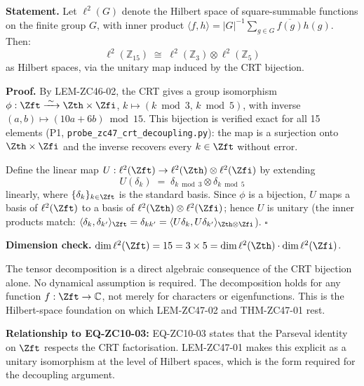 \documentclass[12pt, a4paper]{article}
\begin{document}
\begin{formalbox}[title={LEM-ZC47-01: $\ell^2(\mathbb{Z}_{15})
  \cong \ell^2(\mathbb{Z}_3) \otimes \ell^2(\mathbb{Z}_5)$
  (Tensor Decomposition)}]
\textbf{Statement.}
Let $\ell^2(G)$ denote the Hilbert space of square-summable
functions on the finite group $G$, with inner product
$\langle f, h \rangle = |G|^{-1}\sum_{g \in G}\overline{f(g)}h(g)$.
Then:
\[
  \ell^2(\mathbb{Z}_{15})
  \;\cong\;
  \ell^2(\mathbb{Z}_3) \otimes \ell^2(\mathbb{Z}_5)
\]
as Hilbert spaces, via the unitary map induced by the CRT bijection.

\textbf{Proof.}
By LEM-ZC46-02, the CRT gives a group isomorphism
$\phi: \Zft \xrightarrow{\;\sim\;} \Zth \times \Zfi$,
$k \mapsto (k \bmod 3,\, k \bmod 5)$,
with inverse $(a,b) \mapsto (10a + 6b) \bmod 15$.
This bijection is verified exact for all 15 elements
(P1, \texttt{probe\_zc47\_crt\_decoupling.py}): the map is
a surjection onto $\Zth \times \Zfi$ and the inverse recovers
every $k \in \Zft$ without error.

Define the linear map $U: \ell^2(\Zft) \to \ell^2(\Zth)
\otimes \ell^2(\Zfi)$ by extending
\[
  U(\delta_k) \;=\; \delta_{k\bmod 3} \otimes \delta_{k\bmod 5}
\]
linearly, where $\{\delta_k\}_{k \in \Zft}$ is the standard basis.
Since $\phi$ is a bijection, $U$ maps a basis of $\ell^2(\Zft)$
to a basis of $\ell^2(\Zth) \otimes \ell^2(\Zfi)$; hence $U$
is unitary (the inner products match:
$\langle \delta_k, \delta_{k'} \rangle_{\Zft}
= \delta_{kk'} = \langle U\delta_k, U\delta_{k'}\rangle_{\Zth \otimes \Zfi}$).
\hfill$\square$

\textbf{Dimension check.}
$\dim \ell^2(\Zft) = 15 = 3 \times 5
= \dim\ell^2(\Zth)\cdot\dim\ell^2(\Zfi)$. \checkmark
\end{formalbox}

\begin{derivedbox}[title={Commentary on LEM-ZC47-01}]
The tensor decomposition is a direct algebraic consequence of the
CRT bijection alone.
No dynamical assumption is required.
The decomposition holds for any function $f: \Zft \to \mathbb{C}$,
not merely for characters or eigenfunctions.
This is the Hilbert-space foundation on which
LEM-ZC47-02 and THM-ZC47-01 rest.

\textbf{Relationship to EQ-ZC10-03:}
EQ-ZC10-03 states that the Parseval identity on $\Zft$
respects the CRT factorisation.
LEM-ZC47-01 makes this explicit as a unitary isomorphism at
the level of Hilbert spaces, which is the form required for the
decoupling argument.
\end{derivedbox}
\end{document}
